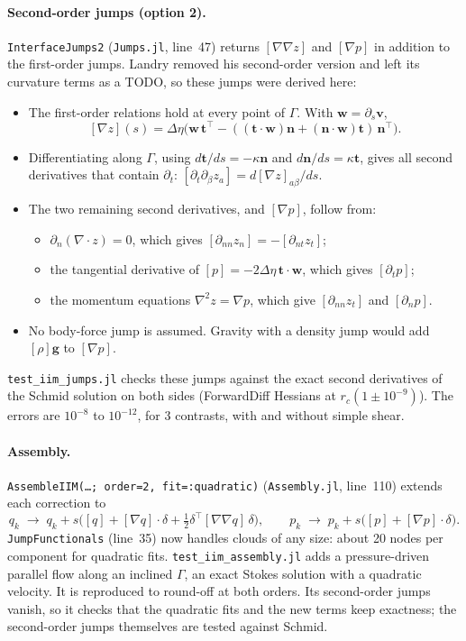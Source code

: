 \documentclass[11pt,a4paper]{article}
\newcommand{\code}[1]{\texttt{#1}}
\begin{document}
\paragraph{Second-order jumps (option 2).} \code{InterfaceJumps2} (\code{Jumps.jl}, line~47)
returns $[\nabla\nabla z]$ and $[\nabla p]$ in addition to the first-order jumps. Landry
removed his second-order version and left its curvature terms as a TODO, so these jumps were
derived here:
\begin{itemize}
  \item The first-order relations hold at every point of $\Gamma$. With $\mathbf w=\partial_s\mathbf v$,
    \[
    [\nabla z](s)=\Delta\eta\bigl(\mathbf w\,\mathbf t^\top-((\mathbf t\cdot\mathbf w)\mathbf n+(\mathbf n\cdot\mathbf w)\mathbf t)\,\mathbf n^\top\bigr).
    \]
  \item Differentiating along $\Gamma$, using $d\mathbf t/ds=-\kappa\mathbf n$ and
    $d\mathbf n/ds=\kappa\mathbf t$, gives all second derivatives that contain $\partial_t$:
    $[\partial_t\partial_\beta z_a]=d[\nabla z]_{a\beta}/ds$.
  \item The two remaining second derivatives, and $[\nabla p]$, follow from:
    \begin{itemize}
      \item $\partial_n(\nabla\cdot z)=0$, which gives $[\partial_{nn}z_n]=-[\partial_{nt}z_t]$;
      \item the tangential derivative of $[p]=-2\Delta\eta\,\mathbf t\cdot\mathbf w$, which
        gives $[\partial_tp]$;
      \item the momentum equations $\nabla^2z=\nabla p$, which give $[\partial_{nn}z_t]$ and
        $[\partial_np]$.
    \end{itemize}
  \item No body-force jump is assumed. Gravity with a density jump would add $[\rho]\mathbf g$
    to $[\nabla p]$.
\end{itemize}
\code{test\_iim\_jumps.jl} checks these jumps against the exact second derivatives of the Schmid
solution on both sides (ForwardDiff Hessians at $r_c(1\pm10^{-9})$). The errors are $10^{-8}$
to $10^{-12}$, for 3 contrasts, with and without simple shear.

\paragraph{Assembly.} \code{AssembleIIM(\dots; order=2, fit=:quadratic)} (\code{Assembly.jl},
line~110) extends each correction to
\[
q_k\;\to\;q_k+s\bigl([q]+[\nabla q]\cdot\delta+\tfrac12\delta^\top[\nabla\nabla q]\,\delta\bigr),
\qquad p_k\;\to\;p_k+s\bigl([p]+[\nabla p]\cdot\delta\bigr).
\]
\code{JumpFunctionals} (line~35) now handles clouds of any size: about 20 nodes per component
for quadratic fits. \code{test\_iim\_assembly.jl} adds a pressure-driven parallel flow along an
inclined $\Gamma$, an exact Stokes solution with a quadratic velocity. It is reproduced to
round-off at both orders. Its second-order jumps vanish, so it checks that the quadratic fits
and the new terms keep exactness; the second-order jumps themselves are tested against Schmid.
\end{document}
